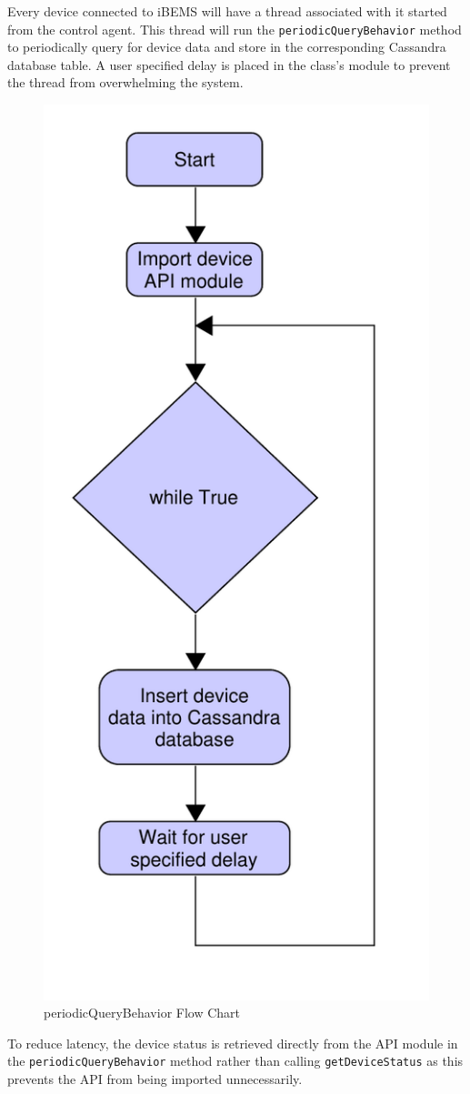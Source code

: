 Every device connected to iBEMS will have a thread associated with it started from the control agent. This thread will run the \texttt{periodicQueryBehavior} method to periodically query for device data and store in the corresponding Cassandra database table. A user specified delay is placed in the class's module to prevent the thread from overwhelming the system.
\begin{figure}[H]
    \centering
    \includegraphics[scale=0.5]{figs/periodicQueryBehavior.pdf}
    \caption{periodicQueryBehavior Flow Chart}
    \label{fig:periodicQueryBehavior}
\end{figure}
To reduce latency, the device status is retrieved directly from the API module in the \texttt{periodicQueryBehavior} method rather than calling \texttt{getDeviceStatus} as this prevents the API from being imported unnecessarily.

